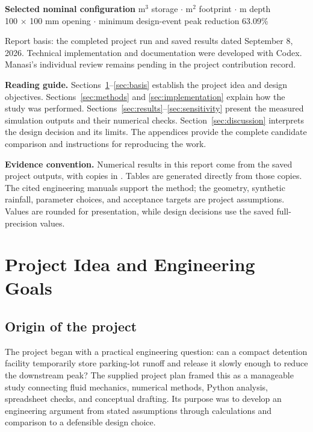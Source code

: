 \documentclass[11pt,letterpaper]{article}
\newcommand{\file}[1]{\texttt{\detokenize{#1}}}
\begin{document}
\begin{titlepage}
\vspace{0.08in}
\colorbox{pale}{\parbox{\dimexpr\linewidth-2\fboxsep\relax}{%
\small\textbf{Selected nominal configuration} m$^3$ storage\; $\cdot$ m$^2$ footprint\; $\cdot$ m depth\\
100 $\times$ 100 mm opening\; $\cdot$\; minimum design-event peak reduction 63.09\%
}}
\vfill
{\footnotesize\color{muted}Report basis: the completed project run and saved
results dated September 8, 2026. Technical implementation and documentation
were developed with Codex. Manasi's individual review remains pending in the
project contribution record.}
\end{titlepage}

\hypersetup{pageanchor=true}
\tableofcontents
\vspace{0.25in}
\textbf{Reading guide.} Sections~\ref{sec:idea}--\ref{sec:basis} establish
the project idea and design objectives. Sections~\ref{sec:methods} and
\ref{sec:implementation} explain how the study was performed.
Sections~\ref{sec:results}--\ref{sec:sensitivity} present the measured
simulation outputs and their numerical checks. Section~\ref{sec:discussion}
interprets the design decision and its limits. The appendices provide the
complete candidate comparison and instructions for reproducing the work.

\textbf{Evidence convention.} Numerical results in this report come from the
saved project outputs, with copies in \file{source_data/}. Tables are generated
directly from those copies. The cited engineering manuals support the method;
the geometry, synthetic rainfall, parameter choices, and acceptance targets
are project assumptions. Values are rounded for presentation, while design
decisions use the saved full-precision values.
\clearpage
{}

\section{Project Idea and Engineering Goals}\label{sec:idea}
\subsection{Origin of the project}
The project began with a practical engineering question: can a compact
detention facility temporarily store parking-lot runoff and release it slowly
enough to reduce the downstream peak? The supplied project plan framed this
as a manageable study connecting fluid mechanics, numerical methods, Python
analysis, spreadsheet checks, and conceptual drafting.\cite{project_plan}
Its purpose was to develop an engineering argument from stated assumptions
through calculations and comparison to a defensible design choice.
\end{document}
